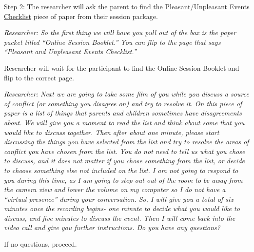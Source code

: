 \documentclass[]{book}
\begin{document}
Step 2:
The researcher will ask the parent to find the \href{https://ucla.app.box.com/file/630327764749}{Pleasant/Unpleasant Events Checklist} piece of paper from their session package.

\emph{Researcher: So the first thing we will have you pull out of the box is the paper packet titled ``Online Session Booklet.'' You can flip to the page that says ``Pleasant and Unpleasant Events Checklist.''}

Researcher will wait for the participant to find the Online Session Booklet and flip to the correct page.

\emph{Researcher: Next we are going to take some film of you while you discuss a source of conflict (or something you disagree on) and try to resolve it. On this piece of paper is a list of things that parents and children sometimes have disagreements about. We will give you a moment to read the list and think about some that you would like to discuss together. Then after about one minute, please start discussing the things you have selected from the list and try to resolve the areas of conflict you have chosen from the list. You do not need to tell us what you chose to discuss, and it does not matter if you chose something from the list, or decide to choose something else not included on the list. I am not going to respond to you during this time, as I am going to step out out of the room to be away from the camera view and lower the volume on my computer so I do not have a ``virtual presence'' during your conversation. So, I will give you a total of six minutes once the recording begins- one minute to decide what you would like to discuss, and five minutes to discuss the event. Then I will come back into the video call and give you further instructions. Do you have any questions?}

If no questions, proceed.
\end{document}
